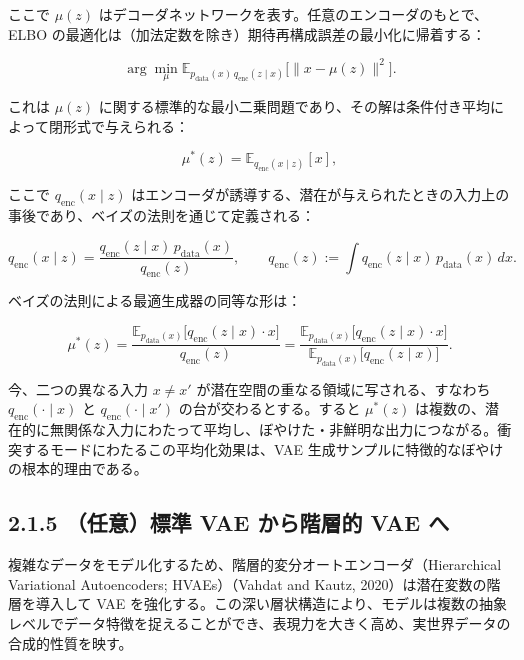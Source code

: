 ここで $\mu(z)$ はデコーダネットワークを表す。任意のエンコーダのもとで、ELBO の最適化は（加法定数を除き）期待再構成誤差の最小化に帰着する：

\[
\arg\min_\mu \mathbb{E}_{p_{\mathrm{data}}(x)\, q_{\mathrm{enc}}(z\mid x)}\bigl[\|x - \mu(z)\|^2\bigr].
\]


これは $\mu(z)$ に関する標準的な最小二乗問題であり、その解は条件付き平均によって閉形式で与えられる：

\[
\mu^*(z) = \mathbb{E}_{q_{\mathrm{enc}}(x\mid z)}[x],
\]



ここで $q_{\mathrm{enc}}(x\mid z)$ はエンコーダが誘導する、潜在が与えられたときの入力上の事後であり、ベイズの法則を通じて定義される：

\[
q_{\mathrm{enc}}(x\mid z) = \frac{q_{\mathrm{enc}}(z\mid x)\, p_{\mathrm{data}}(x)}{q_{\mathrm{enc}}(z)},
\qquad
q_{\mathrm{enc}}(z) := \int q_{\mathrm{enc}}(z\mid x)\, p_{\mathrm{data}}(x)\, dx.
\]


ベイズの法則による最適生成器の同等な形は：

\[
\mu^*(z)
= \frac{\mathbb{E}_{p_{\mathrm{data}}(x)}\bigl[q_{\mathrm{enc}}(z\mid x)\cdot x\bigr]}{q_{\mathrm{enc}}(z)}
= \frac{\mathbb{E}_{p_{\mathrm{data}}(x)}\bigl[q_{\mathrm{enc}}(z\mid x)\cdot x\bigr]}{\mathbb{E}_{p_{\mathrm{data}}(x)}\bigl[q_{\mathrm{enc}}(z\mid x)\bigr]}.
\]


今、二つの異なる入力 $x \neq x'$ が潜在空間の重なる領域に写される、すなわち $q_{\mathrm{enc}}(\cdot\mid x)$ と $q_{\mathrm{enc}}(\cdot\mid x')$ の台が交わるとする。すると $\mu^*(z)$ は複数の、潜在的に無関係な入力にわたって平均し、ぼやけた・非鮮明な出力につながる。衝突するモードにわたるこの平均化効果は、VAE 生成サンプルに特徴的なぼやけの根本的理由である。

\subsection*{2.1.5 （任意）標準 VAE から階層的 VAE へ}


複雑なデータをモデル化するため、階層的変分オートエンコーダ（Hierarchical Variational Autoencoders; HVAEs）（Vahdat and Kautz, 2020）は潜在変数の階層を導入して VAE を強化する。この深い層状構造により、モデルは複数の抽象レベルでデータ特徴を捉えることができ、表現力を大きく高め、実世界データの合成的性質を映す。



